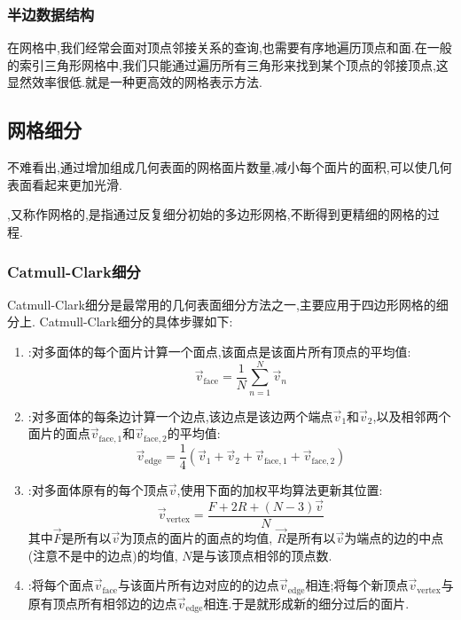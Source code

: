 \documentclass{ctexart}
\begin{document}
\subsubsection{半边数据结构}
在网格中,我们经常会面对顶点邻接关系的查询,也需要有序地遍历顶点和面.在一般的索引三角形网格中,我们只能通过遍历所有三角形来找到某个顶点的邻接顶点,这显然效率很低.就是一种更高效的网格表示方法.
\subsection{网格细分}
不难看出,通过增加组成几何表面的网格面片数量,减小每个面片的面积,可以使几何表面看起来更加光滑.
\begin{definition}[网格细分]
    ,又称作网格的,是指通过反复细分初始的多边形网格,不断得到更精细的网格的过程.
\end{definition}
\subsubsection{Catmull-Clark细分}
Catmull-Clark细分是最常用的几何表面细分方法之一,主要应用于四边形网格的细分上. Catmull-Clark细分的具体步骤如下:
\begin{enumerate}[label=\tbf{\arabic*}.,topsep=0pt,parsep=0pt,itemsep=0pt,partopsep=0pt]
    \item {}:对多面体的每个面片计算一个面点,该面点是该面片所有顶点的平均值:
        \[\vec{v}_{\text{face}}=\dfrac{1}{N}\sum_{n=1}^{N}\vec{v}_n\]
    \item {}:对多面体的每条边计算一个边点,该边点是该边两个端点$\vec{v}_1$和$\vec{v}_2$,以及相邻两个面片的面点$\vec{v}_{\text{face},1}$和$\vec{v}_{\text{face},2}$的平均值:
        \[\vec{v}_{\text{edge}}=\dfrac{1}{4}\left(\vec{v}_1+\vec{v}_2+\vec{v}_{\text{face},1}+\vec{v}_{\text{face},2}\right)\]
    \item {}:对多面体原有的每个顶点$\vec{v}$,使用下面的加权平均算法更新其位置:
        \[\vec{v}_{\text{vertex}}=\dfrac{F+2R+(N-3)\vec{v}}{N}\]
        其中$\vec{F}$是所有以$\vec{v}$为顶点的面片的面点的均值, $\vec{R}$是所有以$\vec{v}$为端点的边的中点(注意不是中的边点)的均值, $N$是与该顶点相邻的顶点数.
    \item {}:将每个面点$\vec{v}_{\text{face}}$与该面片所有边对应的的边点$\vec{v}_{\text{edge}}$相连;将每个新顶点$\vec{v}_{\text{vertex}}$与原有顶点所有相邻边的边点$\vec{v}_{\text{edge}}$相连.于是就形成新的细分过后的面片.
\end{enumerate}
\end{document}
